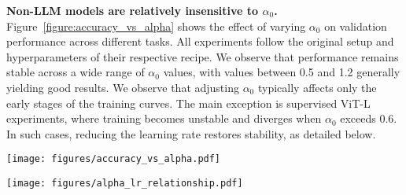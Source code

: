 \documentclass[]{fairmeta}
\renewcommand{\paragraph}[1]{\vspace{1.25mm}\noindent\textbf{#1}}
\begin{document}
\paragraph{Non-LLM models are relatively insensitive to $\alpha_0$.}
Figure~\ref{figure:accuracy_vs_alpha} shows the effect of varying $\alpha_0$ on validation performance across different tasks. All experiments follow the original setup and hyperparameters of their respective recipe.
We observe that performance remains stable across a wide range of $\alpha_0$ values, with values between 0.5 and 1.2 generally yielding good results. We observe that adjusting $\alpha_0$ typically affects only the early stages of the training curves.
The main exception is supervised ViT-L experiments, where training becomes unstable and diverges when $\alpha_0$ exceeds 0.6. In such cases, reducing the learning rate restores stability, as detailed below.


\begin{figure*}[t]
\vskip -0.3in
\centering
\texttt{[image: figures/accuracy\_vs\_alpha.pdf]}
\caption{\textbf{Performance of different tasks across different $\alpha_0$ values.} We benchmark the performance of all non-LLM tasks used in Section \ref{section:experiments} with different initial values of $\alpha$. Performance remains stable across a wide range of $\alpha_0$ values. The only exception is that supervised ViT-L models (top right panel) will diverge for $\alpha_0$ values larger than 0.6.}\label{figure:accuracy_vs_alpha}
\vskip -0.15in
\end{figure*}


\begin{figure*}[b] 
\centering \texttt{[image: figures/alpha\_lr\_relationship.pdf]} \caption{\textbf{Stability across varying $\alpha_0$ values, learning rates, and model sizes.} We train supervised ViT models on the ImageNet-1K dataset and observe that larger models are more prone to instability for both LN and DyT models. Lowering the learning rate or reducing $\alpha_0$ enhances stability. LN shows similar stability to DyT with $\alpha_0 = 0.5$.}

\label{figure:alpha_lr}
\end{figure*} 
\end{document}
